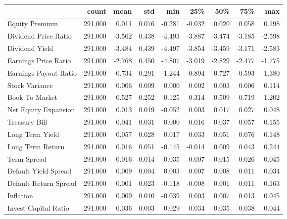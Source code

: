 \begin{tabular}{lrrrrrrrr}
\toprule
{} &   count &   mean &   std &    min &    25\% &    50\% &    75\% &    max \\
\midrule
Equity Premium        & 291.000 &  0.011 & 0.076 & -0.281 & -0.032 &  0.020 &  0.058 &  0.198 \\
Dividend Price Ratio  & 291.000 & -3.502 & 0.438 & -4.493 & -3.887 & -3.474 & -3.185 & -2.598 \\
Dividend Yield        & 291.000 & -3.484 & 0.439 & -4.497 & -3.854 & -3.459 & -3.171 & -2.583 \\
Earnings Price Ratio  & 291.000 & -2.768 & 0.450 & -4.807 & -3.019 & -2.829 & -2.477 & -1.775 \\
Earnings Payout Ratio & 291.000 & -0.734 & 0.291 & -1.244 & -0.894 & -0.727 & -0.593 &  1.380 \\
Stock Variance        & 291.000 &  0.006 & 0.009 &  0.000 &  0.002 &  0.003 &  0.006 &  0.114 \\
Book To Market        & 291.000 &  0.527 & 0.252 &  0.125 &  0.314 &  0.509 &  0.719 &  1.202 \\
Net Equity Expansion  & 291.000 &  0.013 & 0.019 & -0.052 &  0.003 &  0.017 &  0.027 &  0.048 \\
Treasury Bill         & 291.000 &  0.041 & 0.031 &  0.000 &  0.016 &  0.037 &  0.057 &  0.155 \\
Long Term Yield       & 291.000 &  0.057 & 0.028 &  0.017 &  0.033 &  0.051 &  0.076 &  0.148 \\
Long Term Return      & 291.000 &  0.016 & 0.051 & -0.145 & -0.014 &  0.009 &  0.043 &  0.244 \\
Term Spread           & 291.000 &  0.016 & 0.014 & -0.035 &  0.007 &  0.015 &  0.026 &  0.045 \\
Default Yield Spread  & 291.000 &  0.009 & 0.004 &  0.003 &  0.007 &  0.008 &  0.011 &  0.034 \\
Default Return Spread & 291.000 &  0.001 & 0.023 & -0.118 & -0.008 &  0.001 &  0.011 &  0.163 \\
Inflation             & 291.000 &  0.009 & 0.010 & -0.039 &  0.003 &  0.007 &  0.013 &  0.045 \\
Invest Capital Ratio  & 291.000 &  0.036 & 0.003 &  0.029 &  0.034 &  0.035 &  0.038 &  0.044 \\
\bottomrule
\end{tabular}
